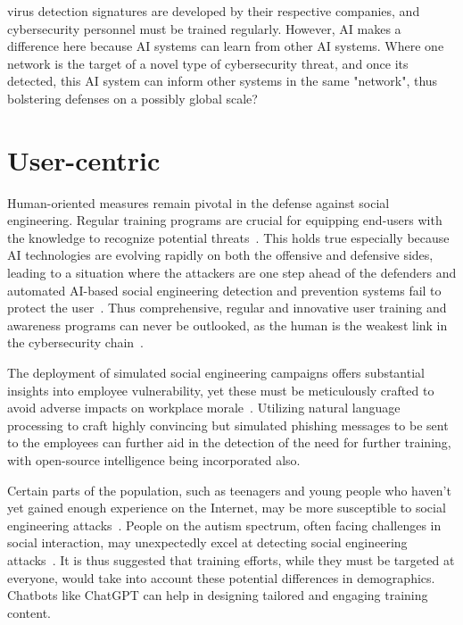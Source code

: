 virus detection signatures are developed by their respective companies, and cybersecurity personnel must be trained regularly. However, AI makes a difference here because AI systems can learn from other AI systems. Where one network is the target of a novel type of cybersecurity threat, and once its detected, this AI system can inform other systems in the same "network", thus bolstering defenses on a possibly global scale?


\section{User-centric}
\begin{comment}    
    - Deepfake content detection
    - Spear phishing detection
\end{comment}

Human-oriented measures remain pivotal in the defense against social engineering. Regular training programs are crucial for equipping end-users with the knowledge to recognize potential threats~\citep{hadnagy_Social_Engineering_The_Science_2018}. This holds true especially because AI technologies are evolving rapidly on both the offensive and defensive sides, leading to a situation where the attackers are one step ahead of the defenders and automated AI-based social engineering detection and prevention systems fail to protect the user~\citep{fakhouri_AI_Driven_Solutions_SE_Attacks_2024}. Thus comprehensive, regular and innovative user training and awareness programs can never be outlooked, as the human is the weakest link in the cybersecurity chain~\citep{mitnick_The_Art_of_Deception_2003}.

The deployment of simulated social engineering campaigns offers substantial insights into employee vulnerability, yet these must be meticulously crafted to avoid adverse impacts on workplace morale~\citep{mitnick_The_Art_of_Deception_2003}. Utilizing natural language processing to craft highly convincing but simulated phishing messages to be sent to the employees can further aid in the detection of the need for further training, with open-source intelligence being incorporated also.

%
%
Certain parts of the population, such as teenagers and young people who haven't yet gained enough experience on the Internet, may be more susceptible to social engineering attacks~\citep{nicholson_Investigating_Teenagers_Detect_Phishing_2020}. People on the autism spectrum, often facing challenges in social interaction, may unexpectedly excel at detecting social engineering attacks~\citep{neupane_Social_Disorders_Facilitate_SE_2018}. It is thus suggested that training efforts, while they must be targeted at everyone, would take into account these potential differences in demographics. Chatbots like ChatGPT can help in designing tailored and engaging training content.















